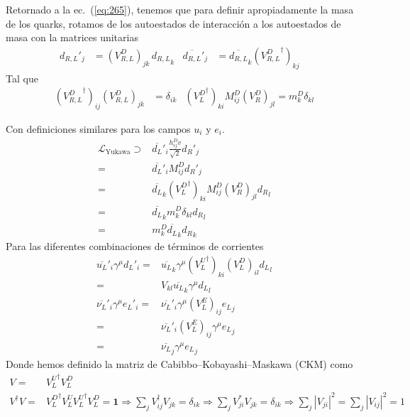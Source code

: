 Retornado a la ec.~(\ref{eq:265}), tenemos que para definir apropiadamente la masa de los quarks, rotamos de los autoestados de interacci\'on a los autoestados de masa con la matrices unitarias
\begin{align}
  \label{eq:229}
  {d_{R,L}}'_j&=(V^D_{R,L})_{jk}\, {d_{R,L}}_k&   \overline{d_{R,L}}'_j&=\overline{d_{R,L}}_k({V^D_{R,L}}^\dagger)_{kj}\,&
\end{align}
Tal que
\begin{align}
  ({V^D_{R,L}}^\dagger)_{ij}(V^D_{R,L})_{jk}&=\delta_{ik}& ({V^D_L}^\dagger)_{ki}M^D_{ij}(V^D_R)_{jl}=m^D_k\delta_{kl}
\end{align}

Con definiciones similares para los campos $u_i$ y $e_i$.
\begin{align}
\mathcal{L}_{\text{Yukawa}}\supset&\overline{d_L}'_i\frac{h_{ij}^Dv}{\sqrt{2}} {d_R}'_j\nonumber\\
=&\overline{d_L}'_iM^D_{ij} {d_R}'_j\nonumber\\
=&\overline{d_L}_k({V^D_L}^\dagger)_{ki}M^D_{ij}(V^D_R)_{jl} {d_R}_l\nonumber\\
=&\overline{d_L}_km^D_k\delta_{kl} {d_R}_l\nonumber\\
=&m^D_k\overline{d_L}_k{d_R}_k
\end{align}
Para las diferentes combinaciones de t\'erminos de corrientes
\begin{align}
  \overline{u_L}'_i \gamma^\mu{d_L}'_i=&\overline{u_L}_k\gamma^\mu({V^U_L}^\dagger)_{ki}(V^D_L)_{il} {d_L}_l\nonumber\\
  =&V_{kl}\overline{u_L}_k\gamma^\mu{d_L}_l\nonumber\\
  \overline{\nu_L}'_i\gamma^\mu {e_L}'_i=&\overline{\nu_L}'_i\gamma^\mu(V^E_L)_{ij} {e_L}_j\nonumber\\
  =&\overline{\nu_L}'_i(V^E_L)_{ij}\gamma^\mu {e_L}_j\nonumber\\
  =&\overline{\nu_L}_j\gamma^\mu{e_L}_j
\end{align}
Donde hemos definido la matriz de Cabibbo--Kobayashi--Maskawa (CKM) como
\begin{align}
  \label{eq:230}
  V=&{V^U_L}^\dagger V^D_L\nonumber\\
  V^\dagger V=&{V^D_L}^\dagger{V^U_L}{V^U_L}^\dagger V^D_L=\mathbf{1}\Rightarrow \sum_jV^\dagger_{ij}V_{jk}=\delta_{ik}\Rightarrow\sum_jV^*_{ji}V_{jk}=\delta_{ik}\Rightarrow\sum_j|V_{ji}|^2=\sum_j|V_{ij}|^2=1
\end{align}

